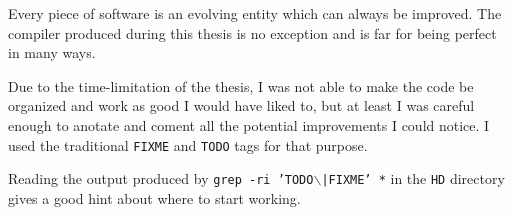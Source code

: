 Every piece of software is an evolving entity which can always be
improved. The compiler produced during this thesis is no exception and
is far for being perfect in many ways.

Due to the time-limitation of the thesis, I was not able to make the
code be organized and work as good I would have liked to, but at least
I was careful enough to anotate and coment all the potential
improvements I could notice.  I used the traditional \texttt{FIXME}
and \texttt{TODO} tags for that purpose.

Reading the output produced by \texttt{grep -ri 'TODO$\backslash$|FIXME' *} in
the \texttt{HD} directory gives a good hint about where to start
working.

